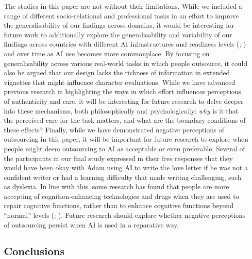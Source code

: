 \documentclass[
  man,
  floatsintext,
  longtable,
  nolmodern,
  notxfonts,
  notimes,
  colorlinks=true,linkcolor=blue,citecolor=blue,urlcolor=blue]{apa7}
\begin{document}
The studies in this paper are not without their limitations. While we
included a range of different socio-relational and professional tasks in
an effort to improve the generalisability of our findings across
domains, it would be interesting for future work to additionally explore
the generalisability and variability of our findings across countries
with different AI infrastructures and readiness levels
(;
) and over time as AI
use becomes more commonplace. By focusing on generalisability across
various real-world tasks in which people outsource, it could also be
argued that our design lacks the richness of information in extended
vignettes that might influence character evaluations. While we have
advanced previous research in highlighting the ways in which effort
influences perceptions of authenticity and care, it will be interesting
for future research to delve deeper into these mechanisms, both
philosophically and psychologically: \emph{why} is it that the perceived
care for the task matters, and what are the boundary conditions of these
effects? Finally, while we have demonstrated negative perceptions of
outsourcing in this paper, it will be important for future research to
explore when people might deem outsourcing to AI as acceptable or even
preferable. Several of the participants in our final study expressed in
their free responses that they would have been okay with Adam using AI
to write the love letter if he was not a confident writer or had a
learning difficulty that made writing challenging, such as dyslexia. In
line with this, some research has found that people are more accepting
of cognition-enhancing technologies and drugs when they are used to
repair cognitive functions, rather than to enhance cognitive functions
beyond ``normal'' levels (; ). Future research should
explore whether negative perceptions of outsourcing persist when AI is
used in a reparative way.

\subsection*{Conclusions}\label{conclusions}
\end{document}
